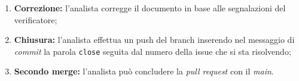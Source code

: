 \begin{itemize}
\begin{enumerate}
		      \item \textbf{Correzione:} l'analista corregge il documento
		            in base alle segnalazioni del verificatore;

		      \item \textbf{Chiusura:} l'analista effettua un push del
		            branch inserendo nel messaggio di \textit{commit} la parola
		            \texttt{close} seguita dal numero della issue che si sta
		            risolvendo;

		      \item \textbf{Secondo merge:} l'analista può concludere la
		            \textit{pull request} con il \textit{main}.
	      \end{enumerate}
\end{itemize}
